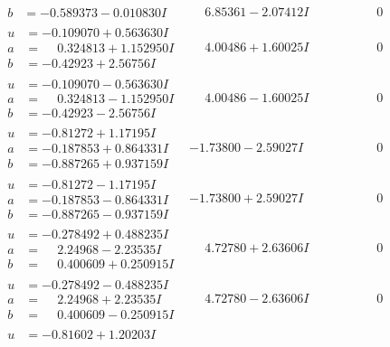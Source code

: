 \documentclass[1p]{elsarticle_modified}
\theoremstyle{definition}
\begin{document}
$$\begin{array}{c|c|c}
\begin{aligned}
b &= -0.589373 - 0.010830 I\end{aligned}
 & \phantom{-}6.85361 - 2.07412 I & \phantom{-0.000000 } 0 \\ \hline\begin{aligned}
u &= -0.109070 + 0.563630 I \\
a &= \phantom{-}0.324813 + 1.152950 I \\
b &= -0.42923 + 2.56756 I\end{aligned}
 & \phantom{-}4.00486 + 1.60025 I & \phantom{-0.000000 } 0 \\ \hline\begin{aligned}
u &= -0.109070 - 0.563630 I \\
a &= \phantom{-}0.324813 - 1.152950 I \\
b &= -0.42923 - 2.56756 I\end{aligned}
 & \phantom{-}4.00486 - 1.60025 I & \phantom{-0.000000 } 0 \\ \hline\begin{aligned}
u &= -0.81272 + 1.17195 I \\
a &= -0.187853 + 0.864331 I \\
b &= -0.887265 + 0.937159 I\end{aligned}
 & -1.73800 - 2.59027 I & \phantom{-0.000000 } 0 \\ \hline\begin{aligned}
u &= -0.81272 - 1.17195 I \\
a &= -0.187853 - 0.864331 I \\
b &= -0.887265 - 0.937159 I\end{aligned}
 & -1.73800 + 2.59027 I & \phantom{-0.000000 } 0 \\ \hline\begin{aligned}
u &= -0.278492 + 0.488235 I \\
a &= \phantom{-}2.24968 - 2.23535 I \\
b &= \phantom{-}0.400609 + 0.250915 I\end{aligned}
 & \phantom{-}4.72780 + 2.63606 I & \phantom{-0.000000 } 0 \\ \hline\begin{aligned}
u &= -0.278492 - 0.488235 I \\
a &= \phantom{-}2.24968 + 2.23535 I \\
b &= \phantom{-}0.400609 - 0.250915 I\end{aligned}
 & \phantom{-}4.72780 - 2.63606 I & \phantom{-0.000000 } 0 \\ \hline\begin{aligned}
u &= -0.81602 + 1.20203 I \\

\end{aligned}
\end{array}$$
\end{document}
